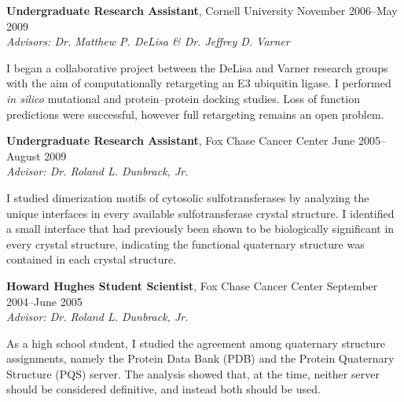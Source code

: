 \documentclass[12pt]{article}
\newcommand{\outreachitem}[4]{
{#1} \hfill {#2} \\
#3 \par
#4 
\par\vspace{0.5\baselineskip}}
\newcommand{\researchitem}[4]{
\outreachitem{#1}{#2}{\textit{#3}}{\vspace{0.5\baselineskip}#4}}
\begin{document}
\researchitem{\textbf{Undergraduate Research Assistant}, Cornell University}{November 2006--May 2009}{Advisors: Dr. Matthew P. DeLisa \& Dr. Jeffrey D. Varner}{
I began a collaborative project between the DeLisa and Varner research groups with the aim of computationally retargeting an E3 ubiquitin ligase.
I performed \textit{in silico} mutational and protein--protein docking studies.
Loss of function predictions were successful, however full retargeting remains an open problem.}

\researchitem{\textbf{Undergraduate Research Assistant}, Fox Chase Cancer Center}{June 2005--August 2009}{Advisor: Dr. Roland L. Dunbrack, Jr.}{
I studied dimerization motifs of cytosolic sulfotransferases by analyzing the unique interfaces in every available sulfotransferase crystal structure.
I identified a small interface that had previously been shown to be biologically significant in every crystal structure, indicating the functional quaternary structure was contained in each crystal structure.}

\researchitem{\textbf{Howard Hughes Student Scientist}, Fox Chase Cancer Center}{September 2004--June 2005}{Advisor: Dr. Roland L. Dunbrack, Jr.}{
As a high school student, I studied the agreement among quaternary structure assignments, namely the Protein Data Bank (PDB) and the Protein Quaternary Structure (PQS) server.
The analysis showed that, at the time, neither server should be considered definitive, and instead both should be used.}
\end{document}
